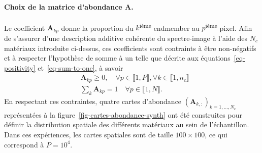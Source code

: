 \paragraph{Choix de la matrice d'abondance $\mathbf{A}$.} Le coefficient $\mathbf{A}_{kp}$ donne la proportion du $k$\textsuperscript{ième} endmember au $p$\textsuperscript{ième} pixel. Afin de s'assurer d'une description additive cohérente du spectre-image à l'aide des $N_c$ matériaux introduite ci-dessus, ces coefficients sont contraints à être non-négatifs et à respecter l'hypothèse de somme à un telle que décrite aux équations~\eqref{eq-positivity} et~\eqref{eq-sum-to-one}, à savoir 
\begin{align}
&\mathbf{A}_{kp} \geq 0,\quad\forall p \in \llbracket 1,P \rrbracket,\forall k\in\llbracket 1,n_c\rrbracket\\
&\sum_k \mathbf{A}_{kp} = 1 \quad \forall p\in\llbracket 1 , N \rrbracket .
\end{align}
En respectant ces contraintes, quatre cartes d'abondance $(\mathbf{A}_{k, :})_{k=1,\dots,N_c}$ représentées à la figure~\ref{fig-cartes-abondance-synth} ont été construites pour définir la distribution spatiale des différents matériaux au sein de l'échantillon. Dans ces expériences, les cartes spatiales sont de taille $100\times 100$, ce qui correspond à $P=10^4$.

